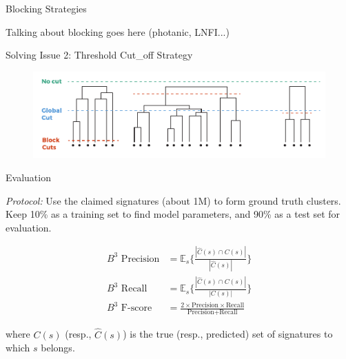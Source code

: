 \documentclass{beamer}
\begin{document}


\begin{frame} {Blocking Strategies}

Talking about blocking goes here (photanic, LNFI...)

\end{frame}




\begin{frame} {Solving Issue 2: Threshold Cut_off Strategy}

\begin{figure}
   \centering
   \includegraphics[width=\textwidth]{./figures/fig-cuts.pdf}
\end{figure}

\end{frame}



\begin{frame}{Evaluation}

{\it Protocol:} Use the {\color{blue} claimed signatures} (about 1M) to form {\color{blue} ground truth clusters}. Keep 10\% as a training set to find model parameters, and 90\% as a test set for evaluation.

\begin{align}
\text{$B^3$ Precision} &= \mathbb{E}_s \{ \frac{|\hat{C}(s) \cap C(s)|}{|\hat{C}(s)|}  \} \\
\text{$B^3$ Recall} &= \mathbb{E}_s \{ \frac{|\hat{C}(s) \cap C(s)|}{|C(s)|}  \} \\
\text{$B^3$ F-score} &= \frac{2 \times \text{Precision} \times \text{Recall}}{\text{Precision} + \text{Recall}}
\end{align}

where $C(s)$ (resp., $\hat{C}(s)$) is the true (resp., predicted) set of signatures to which $s$ belongs.


\end{frame}
\end{document}
